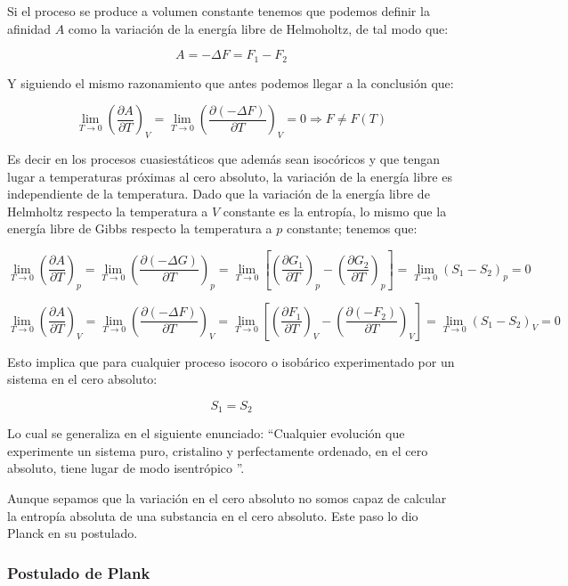 \documentclass[12pt,a4paper]{article}
\newcommand{\parentesis}[1]{\left( #1 \right)}
\newcommand{\parcialesnormales}[2]{\parentesis{\parciales{ #1}{#2 }}}
\newcommand{\parciales}[2]{\frac{\partial #1}{\partial #2}}
\begin{document}
Si el proceso se produce a volumen constante tenemos que podemos definir la afinidad $A$ como la variación de la energía libre de Helmoholtz, de tal modo que:

\begin{equation}
A = - \Delta F = F_1 - F_2
\end{equation} 

Y siguiendo el mismo razonamiento que antes podemos llegar a la conclusión que:

$$ \lim_{T\rightarrow 0} \parcialesnormales{A}{T}_V  = \lim_{T\rightarrow 0} \parcialesnormales{(-\Delta F)}{T}_V  = 0  \Longrightarrow F \neq F(T) $$

Es decir en los procesos cuasiestáticos que además sean isocóricos y que tengan lugar a temperaturas próximas al cero absoluto, la variación de la energía libre es independiente de la temperatura. Dado que la variación de la energía libre de Helmholtz respecto la temperatura a $V$ constante es la entropía, lo mismo que la energía libre de Gibbs respecto la temperatura a $p$ constante; tenemos que:


$$ \lim_{T\rightarrow 0} \parcialesnormales{A}{T}_p  = \lim_{T\rightarrow 0} \parcialesnormales{(-\Delta G)}{T}_p  =  \lim_{T\rightarrow 0} \left[ \parcialesnormales{G_1}{T}_p - \parcialesnormales{G_2}{T}_p \right] = \lim_{T\rightarrow 0} (S_1 - S_2)_p = 0 $$



$$ \lim_{T\rightarrow 0} \parcialesnormales{A}{T}_V  = \lim_{T\rightarrow 0} \parcialesnormales{(-\Delta F)}{T}_V  =  \lim_{T\rightarrow 0} \left[ \parcialesnormales{F_1}{T}_V - \parcialesnormales{(-F_2)}{T}_V \right] = \lim_{T\rightarrow 0} (S_1 - S_2)_V = 0 $$
 
Esto implica que para cualquier proceso isocoro o isobárico experimentado por un sistema en el cero absoluto:

$$ S_1 = S_2 $$

Lo cual se generaliza en el siguiente enunciado: ``Cualquier evolución que experimente un sistema puro, cristalino y perfectamente ordenado, en el cero absoluto, tiene lugar de modo isentrópico ''. 

Aunque sepamos que la variación en el cero absoluto no somos capaz de calcular la entropía absoluta de una substancia en el cero absoluto. Este paso lo dio Planck en su postulado.


\subsubsection{Postulado de Plank}
\end{document}
